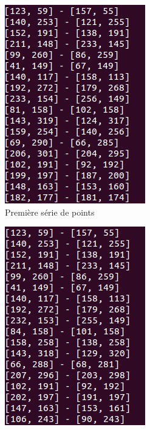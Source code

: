 \documentclass [a4 paper,11pt]{article}
\begin{document}
\begin{figure}
\centering
\begin{subfigure}{0.5\textwidth}
  \centering
  \includegraphics[width=0.8\linewidth]{pts1.png}
  \caption{Première série de points}
  \label{fig:pts1}
\end{subfigure}%
\begin{subfigure}{0.5\textwidth}
  \centering
  \includegraphics[width=0.8\linewidth]{pts2.png}

\end{subfigure}
\end{figure}
\end{document}
